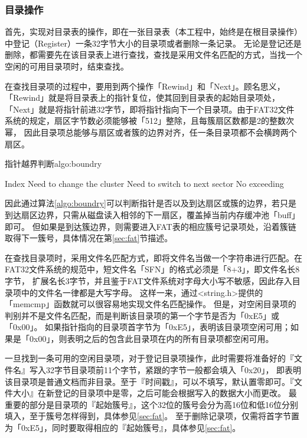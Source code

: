\subsubsection{目录操作}
\label{sec:dir}
首先，实现对目录表的操作，即在一张目录表（本工程中，始终是在根目录操作）中登记（Register）一条32字节大小的目录项或者删除一条记录。
无论是登记还是删除，都需要先在该目录表上进行查找，查找是采用文件名匹配的方式，当找一个空闲的可用目录项时，结束查找。

在查找目录项的过程中，要用到两个操作「Rewind」和「Next」。顾名思义，「Rewind」就是将目录表上的指针复位，使其回到目录表的起始目录项处，
「Next」就是将指针前进32字节，即将指针指向下一个目录项。由于FAT32文件系统的规定，扇区字节数必须能够被「512」整除，且每簇扇区数都是2的整数次幂，
因此目录项总能够与扇区或者簇的边界对齐，任一条目录项都不会横跨两个扇区。
\begin{balgo}{指针越界判断}{algo:boundry}
\begin{algorithmic}
\Require Index 
     
    \State Need to change the cluster
    \Else{}
    \State Need to switch to next sector
    \EndIf
\Else{}
    \State No exceeding
\EndIf
\end{algorithmic}
\end{balgo}
因此通过算法\ref{algo:boundry}可以判断指针是否以及到达扇区或簇的边界，若只是到达扇区边界，只需从磁盘读入相邻的下一扇区，覆盖掉当前内存缓冲池「buff」即可。
但如果是到达簇边界，则需要进入FAT表的相应簇号记录项处，沿着簇链取得下一簇号，具体情况在第\ref{sec:fat}节描述。

在查找目录项时，采用文件名匹配方式，即将文件名当做一个字符串进行匹配。在FAT32文件系统的规范中，短文件名「SFN」的格式必须是「8+3」，即文件名长8字节，
扩展名长3字节，并且鉴于FAT文件系统对字母大小写不敏感，因此存入目录项中的文件名一律都是大写字母。
这样一来，通过<string.h>提供的「memcmp」函数就可以很容易地实现文件名匹配操作。
但是，对空闲目录项的判别并不是文件名匹配，而是判断该目录项的第一个字节是否为「0xE5」或「0x00」。
如果指针指向的目录项首字节为「0xE5」，表明该目录项空闲可用；如果是「0x00」，则表明之后的包含此目录项在内的所有目录项都空闲可用。

一旦找到一条可用的空闲目录项，对于登记目录项操作，此时需要将准备好的『文件名』写入32字节目录项前11个字节，紧跟的字节一般都会填入「0x20」，
即表明该目录项是普通文档而非目录。至于『时间戳』，可以不填写，默认置零即可。『文件大小』在新登记的目录项中是零，之后可能会根据写入的数据大小而更改。
最重要的部分是目录项的『起始簇号』，这个32位的簇号会分为高16位和低16位分别填入，至于簇号怎样得到，具体参见\ref{sec:fat}。
至于删除记录项，仅需将首字节置为「0xE5」，同时要取得相应的『起始簇号』，具体参见\ref{sec:fat}。

